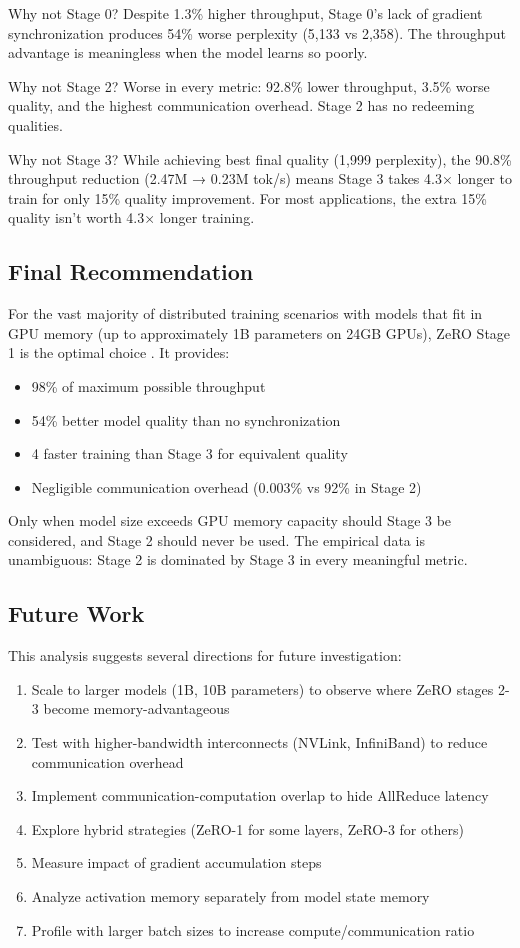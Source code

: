 { Why not Stage 0?  Despite 1.3\% higher throughput, Stage 0's lack of gradient synchronization produces 54\% worse perplexity (5,133 vs 2,358). The throughput advantage is meaningless when the model learns so poorly.

 Why not Stage 2?  Worse in every metric: 92.8\% lower throughput, 3.5\% worse quality, and the highest communication overhead. Stage 2 has no redeeming qualities.

 Why not Stage 3?  While achieving best final quality (1,999 perplexity), the 90.8\% throughput reduction (2.47M → 0.23M tok/s) means Stage 3 takes 4.3× longer to train for only 15\% quality improvement. For most applications, the extra 15\% quality isn't worth 4.3× longer training.


\subsection{Final Recommendation}

For the vast majority of distributed training scenarios with models that fit in GPU memory (up to approximately 1B parameters on 24GB GPUs),  ZeRO Stage 1 is the optimal choice . It provides:
\begin{itemize}
    \item 98\% of maximum possible throughput
    \item 54\% better model quality than no synchronization
    \item 4 \times faster training than Stage 3 for equivalent quality
    \item Negligible communication overhead  (0.003\% vs 92\% in Stage 2)
\end{itemize}

Only when model size exceeds GPU memory capacity should Stage 3 be considered, and Stage 2 should never be used. The empirical data is unambiguous: Stage 2 is dominated by Stage 3 in every meaningful metric.

\subsection{Future Work}

This analysis suggests several directions for future investigation:
\begin{enumerate}
    \item Scale to larger models (1B, 10B parameters) to observe where ZeRO stages 2-3 become memory-advantageous
    \item Test with higher-bandwidth interconnects (NVLink, InfiniBand) to reduce communication overhead
    \item Implement communication-computation overlap to hide AllReduce latency
    \item Explore hybrid strategies (ZeRO-1 for some layers, ZeRO-3 for others)
    \item Measure impact of gradient accumulation steps
    \item Analyze activation memory separately from model state memory
    \item Profile with larger batch sizes to increase compute/communication ratio
\end{enumerate}


}
